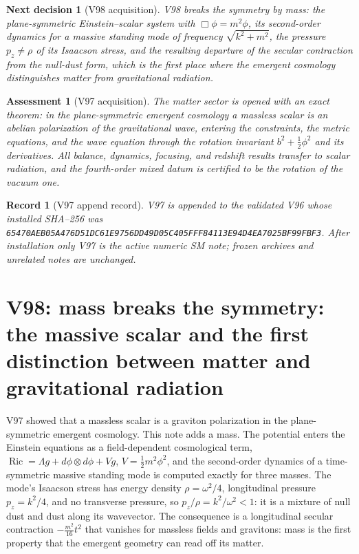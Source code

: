 \documentclass[11pt]{article}
\newtheorem{decision}[theorem]{Next decision}
\newtheorem{assessment}[theorem]{Assessment}
\newtheorem{record}[theorem]{Record}
\theoremstyle{remark}
\begin{document}
\begin{decision}[V98 acquisition]
\label{dec:v19v97-next}
V98 breaks the symmetry by mass: the plane-symmetric Einstein--scalar
system with \(\Box\phi=m^2\phi\), its second-order dynamics for a
massive standing mode of frequency \(\sqrt{k^2+m^2}\), the pressure
\(p_z\neq\rho\) of its Isaacson stress, and the resulting departure of
the secular contraction from the null-dust form, which is the first
place where the emergent cosmology distinguishes matter from
gravitational radiation.
\end{decision}

\begin{assessment}[V97 acquisition]
\label{ass:v19v97}
The matter sector is opened with an exact theorem: in the
plane-symmetric emergent cosmology a massless scalar is an abelian
polarization of the gravitational wave, entering the constraints,
the metric equations, and the wave equation through the rotation
invariant \(b^2+\tfrac12\phi^2\) and its derivatives.  All balance,
dynamics, focusing, and redshift results transfer to scalar
radiation, and the fourth-order mixed datum is certified to be the
rotation of the vacuum one.
\end{assessment}

\begin{record}[V97 append record]
\label{rec:v19v97}
V97 is appended to the validated V96 whose installed SHA--256 was
\texttt{65470AEB05A476D51DC61E9756DD49D05C405FFF84113E94D4EA7025BF99FBF3}.
After installation only V97 is the active numeric SM note; frozen
archives and unrelated notes are unchanged.
\end{record}


\section{V98: mass breaks the symmetry: the massive scalar and the first distinction between matter and gravitational radiation}
\label{sec:v19v98}

V97 showed that a massless scalar is a graviton polarization in the
plane-symmetric emergent cosmology.  This note adds a mass.  The
potential enters the Einstein equations as a field-dependent
cosmological term, \(\operatorname{Ric}=\Lambda g+d\phi\otimes d\phi+Vg\),
\(V=\tfrac12m^2\phi^2\), and the second-order dynamics of a
time-symmetric massive standing mode is computed exactly for three
masses.  The mode's Isaacson stress has energy density
\(\rho=\omega^2/4\), longitudinal pressure \(p_z=k^2/4\), and no
transverse pressure, so \(p_z/\rho=k^2/\omega^2<1\): it is a mixture
of null dust and dust along its wavevector.  The consequence is a
longitudinal secular contraction \(-\tfrac{m^2}{16}t^2\) that vanishes
for massless fields and gravitons: mass is the first property that
the emergent geometry can read off its matter.
\end{document}
